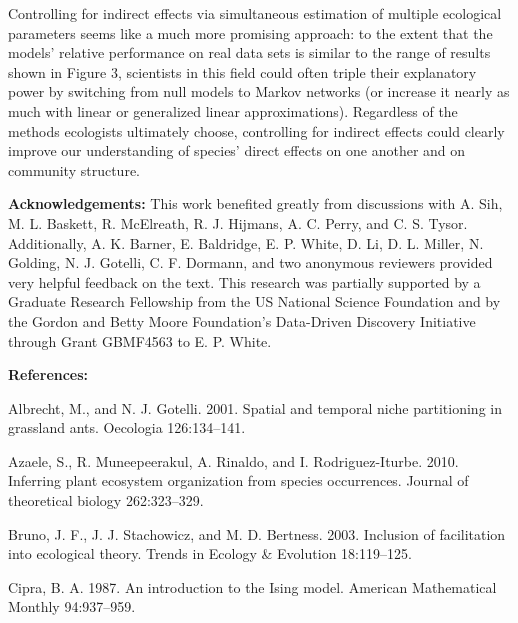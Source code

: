 \documentclass[12pt,]{article}
\begin{document}
\begin{spacing}{1.9}
\begin{flushleft}
Controlling for indirect effects via simultaneous estimation of multiple
ecological parameters seems like a much more promising approach: to the
extent that the models' relative performance on real data sets is
similar to the range of results shown in Figure 3, scientists in this
field could often triple their explanatory power by switching from null
models to Markov networks (or increase it nearly as much with linear or
generalized linear approximations). Regardless of the methods ecologists
ultimately choose, controlling for indirect effects could clearly
improve our understanding of species' direct effects on one another and
on community structure.

\noindent \textbf{Acknowledgements:} This work benefited greatly from
discussions with A. Sih, M. L. Baskett, R. McElreath, R. J. Hijmans, A.
C. Perry, and C. S. Tysor. Additionally, A. K. Barner, E. Baldridge, E.
P. White, D. Li, D. L. Miller, N. Golding, N. J. Gotelli, C. F. Dormann,
and two anonymous reviewers provided very helpful feedback on the text.
This research was partially supported by a Graduate Research Fellowship
from the US National Science Foundation and by the Gordon and Betty
Moore Foundation's Data-Driven Discovery Initiative through Grant
GBMF4563 to E. P. White.

\setlength{\parindent}{0cm}
\setlength{\parskip}{0pt}

\noindent \textbf{References:}

\setlength{\parindent}{-1em} \setlength{\leftskip}{1em}

Albrecht, M., and N. J. Gotelli. 2001. Spatial and temporal niche
partitioning in grassland ants. Oecologia 126:134--141.

Azaele, S., R. Muneepeerakul, A. Rinaldo, and I. Rodriguez-Iturbe. 2010.
Inferring plant ecosystem organization from species occurrences. Journal
of theoretical biology 262:323--329.

Bruno, J. F., J. J. Stachowicz, and M. D. Bertness. 2003. Inclusion of
facilitation into ecological theory. Trends in Ecology \& Evolution
18:119--125.

Cipra, B. A. 1987. An introduction to the Ising model. American
Mathematical Monthly 94:937--959.


\end{flushleft}
\end{spacing}
\end{document}
